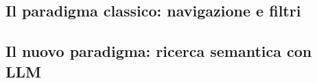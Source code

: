 \subsection{Il paradigma classico: navigazione e filtri}
\label{subsec:paradigma_classico}
%
%
%

\subsection{Il nuovo paradigma: ricerca semantica con LLM}
\label{subsec:paradigma_semantico}
%
%
%
%


